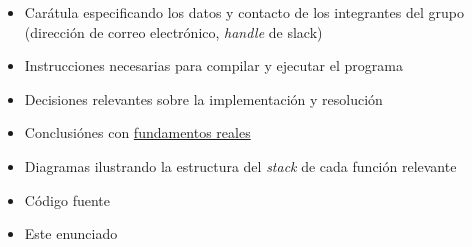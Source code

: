 \documentclass{article}
\begin{document}
\begin{itemize}
\item Carátula especificando los datos y contacto de los integrantes del grupo (dirección de correo electrónico, \textit{handle} de slack)
\item Instrucciones necesarias para compilar y ejecutar el programa
\item Decisiones relevantes sobre la implementación y resolución
\item Conclusiónes con \underline{fundamentos reales}
\item Diagramas ilustrando la estructura del \textit{stack} de cada función relevante
\item Código fuente
\item Este enunciado
\end{itemize}
\end{document}
